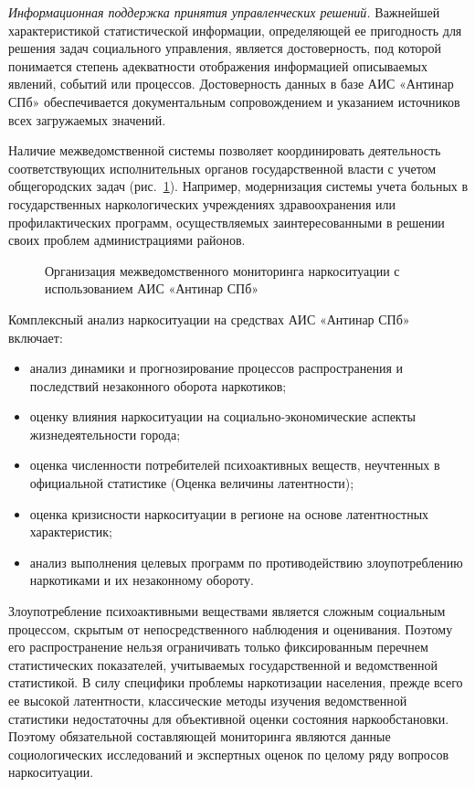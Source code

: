 \textit{Информационная поддержка принятия управленческих решений.}
Важнейшей характеристикой статистической информации, определяющей ее пригодность
для решения задач социального управления, является достоверность, под которой
понимается степень адекватности отображения информацией описываемых явлений,
событий или процессов. Достоверность данных в базе АИС «Антинар СПб»
обеспечивается документальным сопровождением и указанием источников всех
загружаемых значений.

Наличие межведомственной системы позволяет координировать деятельность
соответствующих исполнительных органов государственной власти с учетом
общегородских задач (рис.~\ref{fig:org_mezhved_antinar}). Например,
модернизация системы учета больных в государственных наркологических учреждениях
здравоохранения или профилактических программ, осуществляемых заинтересованными
в решении своих проблем администрациями  районов.

\begin{figure}
    \caption{Организация межведомственного мониторинга наркоситуации с
    использованием АИС «Антинар СПб»}
    \label{fig:org_mezhved_antinar}
\end{figure}

Комплексный анализ наркоситуации на средствах АИС «Антинар СПб» включает:
\begin{itemize}
\item анализ динамики и прогнозирование  процессов  распространения и последствий
незаконного оборота наркотиков;
\item оценку влияния наркоситуации на социально-экономические аспекты
жизнедеятельности города;
\item оценка численности потребителей психоактивных веществ, неучтенных в
официальной статистике (Оценка величины латентности);
\item оценка кризисности наркоситуации в регионе на основе латентностных
характеристик;
\item анализ выполнения целевых программ по противодействию злоупотреблению
наркотиками и их незаконному обороту.
\end{itemize}

Злоупотребление психоактивными веществами является сложным социальным процессом,
скрытым от непосредственного наблюдения и оценивания. Поэтому его
распространение нельзя ограничивать только фиксированным перечнем статистических
показателей, учитываемых государственной и ведомственной статистикой. В силу
специфики проблемы наркотизации населения, прежде всего ее высокой латентности,
классические методы изучения ведомственной статистики недостаточны для
объективной оценки состояния наркообстановки. Поэтому обязательной составляющей
мониторинга являются данные социологических исследований и экспертных оценок  по
целому ряду вопросов наркоситуации.

